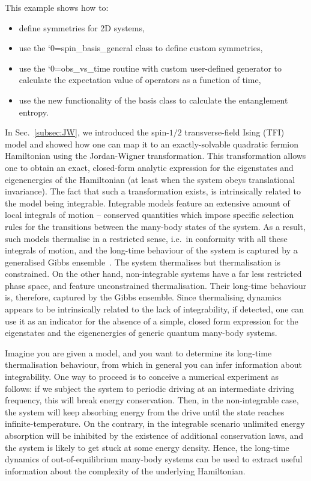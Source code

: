 \documentclass{SciPost}
\newcommand\0{\scalebox{-1}[1]{0}}
\let\svttfamily\ttfamily
\renewcommand\ttfamily{\svttfamily\catcode`0=\active }
\renewcommand\texttt{\bgroup\ttfamily\texttthelp}
\def\texttthelp#1{#1\egroup}
\begin{document}
This example shows how to:
\begin{itemize}
	\item define symmetries for 2D systems,
	\item use the \texttt{spin\_basis\_general} class to define custom symmetries,
	\item use the \texttt{obs\_vs\_time} routine with custom user-defined generator to calculate the expectation value of operators as a function of time,
	\item use the new functionality of the basis class to calculate the entanglement entropy.
\end{itemize}

 In Sec.~\ref{subsec:JW}, we introduced the spin-$1/2$ transverse-field Ising (TFI) model and showed how one can map it to an exactly-solvable quadratic fermion Hamiltonian using the Jordan-Wigner transformation. This transformation allows one to obtain an exact, closed-form analytic expression for the eigenstates and eigenenergies of the Hamiltonian (at least when the system obeys translational invariance). The fact that such a transformation exists, is intrinsically related to the model being integrable. Integrable models feature an extensive amount of local integrals of motion -- conserved quantities which impose specific selection rules for the transitions between the many-body states of the system. As a result, such models thermalise in a restricted sense, i.e.~in conformity with all these integrals of motion, and the long-time behaviour of the system is captured by a generalised Gibbs ensemble~\cite{TD_review}. The system thermalises but thermalisation is constrained. On the other hand, non-integrable systems have a far less restricted phase space, and feature unconstrained thermalisation. Their long-time behaviour is, therefore, captured by the Gibbs ensemble. Since thermalising dynamics appears to be intrinsically related to the lack of integrability, if detected, one can use it as an indicator for the absence of a simple, closed form expression for the eigenstates and the eigenenergies of generic quantum many-body systems.

Imagine you are given a model, and you want to determine its long-time thermalisation behaviour, from which in general you can infer information about integrability. One way to proceed is to conceive a numerical experiment as follows: if we subject the system to periodic driving at an intermediate driving frequency, this will break energy conservation. Then, in the non-integrable case, the system will keep absorbing energy from the drive until the state reaches infinite-temperature. On the contrary, in the integrable scenario unlimited energy absorption will be inhibited by the existence of additional conservation laws, and the system is likely to get stuck at some energy density. Hence, the long-time dynamics of out-of-equilibrium many-body systems can be used to extract useful information about the complexity of the underlying Hamiltonian.
\end{document}
